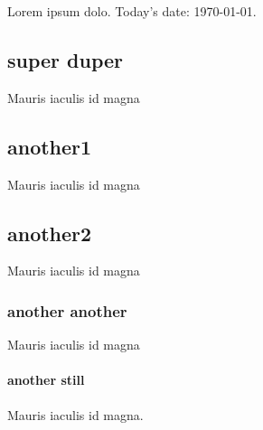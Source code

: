 Lorem ipsum dolo. Today's date: \today.
\subsection{super duper}
\label{super duper}
Mauris iaculis id magna 
\subsection{another1}
Mauris iaculis id magna 
\subsection{another2}
Mauris iaculis id magna
\subsubsection{another another}
Mauris iaculis id magna
\paragraph{another still}
Mauris iaculis id magna. 






